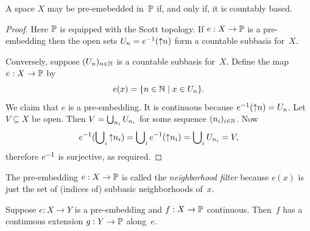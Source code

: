 \begin{theorem}
  \label{thm:scott-embedding}%
  A space $X$ may be pre-emebedded in~$\mathbb{P}$ if, and only if, it is
  countably based.
\end{theorem}

\begin{proof}
  Here $\mathbb{P}$ is equipped with the Scott topology. If $e : X \to
  \mathbb{P}$ is a pre-embedding then the open sets $U_n =
  {e}^{-1}({\uparrow}n)$ form a countable subbasis for~$X$.

  Conversely, suppose $(U_n)_{n \in \mathbb{N}}$ is a countable subbasis
  for~$X$. Define the map $e : X \to \mathbb{P}$ by
  \begin{equation*}
    e(x) = \{n \in \mathbb{N} \mid x \in U_n\}.
  \end{equation*}
  We claim that $e$ is a pre-embedding. It is continuous because
  ${e}^{-1}({\uparrow}n) = U_n$. Let $V \subseteq X$ be open. Then $V =
  \bigcup\nolimits_{n_i} U_{n_i}$ for some sequence $(n_i)_{i \in \mathbb{N}}$. Now
  \begin{equation*}
    {e}^{-1}(\bigcup\nolimits_i {\uparrow}n_i) =
      \bigcup\nolimits_i {e}^{-1}({\uparrow}n_i) =
      \bigcup\nolimits_i U_{n_i} = V,
  \end{equation*}
  therefore ${e}^{-1}$ is surjective, as required.
\end{proof}

\noindent
%
The pre-embedding $e : X \to \mathbb{P}$ is called the \emph{neighborhood
  filter} because $e(x)$ is just the set of (indices of) subbasic
neighborhoods of~$x$.

\begin{theorem}
  \label{thm:scott-extension}%
  Suppose $e : X \to Y$ is a pre-embedding and $f : X \to \mathbb{P}$
  continuous. Then~$f$ has a continuous extension $g : Y \to \mathbb{P}$
  along~$e$.
\end{theorem}

